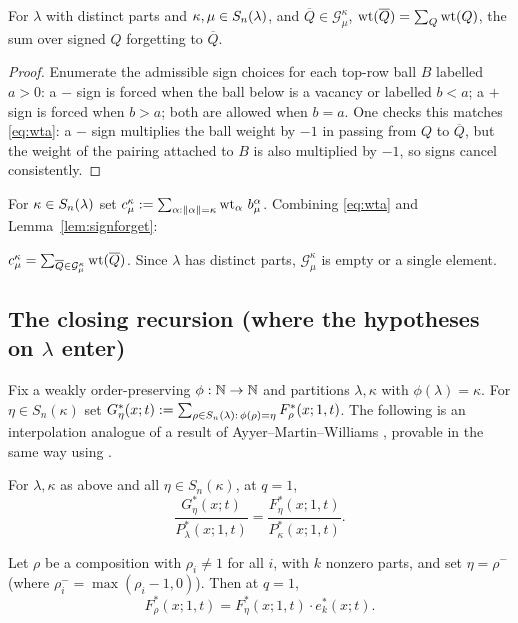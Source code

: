 \begin{qthreelemma}\label{lem:signforget}
For $\lambda$ with distinct parts and $\kappa,\mu\in S_n(\lambda)$, and $\overline Q\in\mathcal G^\kappa_\mu$,
$\operatorname{wt}(\overline Q)=\sum_Q\operatorname{wt}(Q)$, the sum over signed $Q$ forgetting to $\overline Q$.
\end{qthreelemma}

\begin{proof}
Enumerate the admissible sign choices for each top-row ball $B$ labelled $a>0$:
a $-$ sign is forced when the ball below is a vacancy or labelled $b<a$; a $+$
sign is forced when $b>a$; both are allowed when $b=a$. One checks this matches
\eqref{eq:wta}: a $-$ sign multiplies the ball weight by $-1$ in passing from
$Q$ to $\overline Q$, but the weight of the pairing attached to $B$ is also
multiplied by $-1$, so signs cancel consistently.
\end{proof}

For $\kappa\in S_n(\lambda)$ set $c^\kappa_\mu:=\sum_{\alpha:\|\alpha\|=\kappa}\operatorname{wt}_\alpha\,b^\alpha_\mu$.
Combining \eqref{eq:wta} and Lemma~\ref{lem:signforget}:

\begin{qthreelemma}\label{lem:ckm}
$c^\kappa_\mu=\sum_{\overline Q\in\mathcal G^\kappa_\mu}\operatorname{wt}(\overline Q)$. Since $\lambda$ has distinct
parts, $\mathcal G^\kappa_\mu$ is empty or a single element.
\end{qthreelemma}

\subsection*{The closing recursion (where the hypotheses on $\lambda$ enter)}

Fix a weakly order-preserving $\phi:\mathbb{N}\to\mathbb{N}$ and partitions $\lambda,\kappa$ with
$\phi(\lambda)=\kappa$. For $\eta\in S_n(\kappa)$ set
$G^*_\eta(x;t):=\sum_{\rho\in S_n(\lambda):\,\phi(\rho)=\eta}F^*_\rho(x;1,t)$. The following
is an interpolation analogue of a result of Ayyer--Martin--Williams
\cite{AMW25}, provable in the same way using \cite{AS19}.

\begin{qthreetheorem}\label{thm:G}
For $\lambda,\kappa$ as above and all $\eta\in S_n(\kappa)$, at $q=1$,
\[
\frac{G^*_\eta(x;t)}{P^*_\lambda(x;1,t)}=\frac{F^*_\eta(x;1,t)}{P^*_\kappa(x;1,t)} .
\]
\end{qthreetheorem}

\begin{qthreecorollary}\label{cor:rec}
Let $\rho$ be a composition with $\rho_i\ne1$ for all $i$, with $k$ nonzero
parts, and set $\eta=\rho^-$ (where $\rho^-_i=\max(\rho_i-1,0)$). Then at $q=1$,
\[
F^*_\rho(x;1,t)=F^*_\eta(x;1,t)\cdot e^*_k(x;t).
\]
\end{qthreecorollary}

